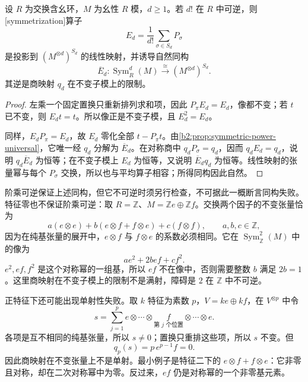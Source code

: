 \begin{proposition}\label{b2:prop:symmetrization-characteristic}
	设 \(R\) 为交换含幺环，\(M\) 为幺性 \(R\) 模，\(d\ge1\)。若 \(d!\) 在 \(R\) 中可逆，则[symmetrization]算子
	\[
		E_d=\frac1{d!}\sum_{\sigma\in S_d}P_\sigma
	\]
	是投影到 \((M^{\otimes d})^{S_d}\) 的线性映射，并诱导自然同构
	\[
		\overline E_d:\operatorname{Sym}_R^d(M)\xrightarrow{\ \cong\ }(M^{\otimes d})^{S_d}.
	\]
	其逆是商映射 \(q_d\) 在不变子模上的限制。
\end{proposition}
\begin{proof}
	左乘一个固定置换只重新排列求和项，因此 \(P_\pi E_d=E_d\)，像都不变；若 \(t\) 已不变，则 \(E_dt=t\)。所以像正是不变子模，且 \(E_d^2=E_d\)。

	同样，\(E_dP_\pi=E_d\)，故 \(E_d\) 零化全部 \(t-P_\pi t\)。由\cref{b2:prop:symmetric-power-universal}，它唯一经 \(q_d\) 分解为 \(\overline E_d\)。在对称商中 \(q_dP_\sigma=q_d\)，因而 \(q_dE_d=q_d\)，说明 \(q_d\overline E_d\) 为恒等；在不变子模上 \(E_d\) 为恒等，又说明 \(\overline E_dq_d\) 为恒等。线性映射的张量幂与每个 \(P_\sigma\) 交换，所以也与平均算子相容；所得同构因此自然。
\end{proof}

阶乘可逆保证上述同构，但它不可逆时须另行检查，不可据此一概断言同构失败。特征零也不保证阶乘可逆：取 \(R=\mathbb Z\)、\(M=\mathbb Ze\oplus\mathbb Zf\)。交换两个因子的不变张量恰为
\[
	a(e\otimes e)+b(e\otimes f+f\otimes e)+c(f\otimes f), \qquad a,b,c\in\mathbb Z,
\]
因为在纯基张量的展开中，\(e\otimes f\) 与 \(f\otimes e\) 的系数必须相同。它在 \(\operatorname{Sym}_{\mathbb Z}^2(M)\) 中的像为
\[
	ae^2+2bef+cf^2.
\]
\(e^2,ef,f^2\) 是这个对称幂的一组基，所以 \(ef\) 不在像中，否则需要整数 \(b\) 满足 \(2b=1\)。这里商映射在不变子模上的限制不是满射，障碍是 \(2\) 在 \(\mathbb Z\) 中不可逆。

\ProseParagraphBreak
正特征下还可能出现单射性失败。取 \(k\) 特征为素数 \(p\)，\(V=ke\oplus kf\)，在 \(V^{\otimes p}\) 中令
\[
	s=\sum_{j=1}^p e\otimes\cdots\otimes \underset{\text{第 }j\text{ 个位置}}{f} \otimes\cdots\otimes e.
\]
各项是互不相同的纯基张量，所以 \(s\ne0\)；置换只重排这些项，所以 \(s\) 不变。但
\[
	q_p(s)=p\,e^{p-1}f=0.
\]
因此商映射在不变张量上不是单射。最小例子是特征二下的 \(e\otimes f+f\otimes e\)：它非零且对称，却在二次对称幂中为零。反过来，\(ef\) 仍是对称幂的一个非零基元素。

